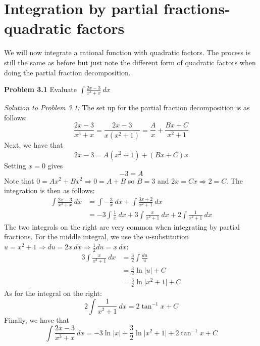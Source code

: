 \documentclass[11pt]{scrartcl}
\begin{document}
\section{Integration by partial fractions-quadratic factors}
We will now integrate a rational function with quadratic factors. The process is still the same as before but just note the different form of quadratic factors when doing the partial fraction decomposition. 
\begin{tcolorbox}
[colback=purple!5!white,colframe=purple!75!black]
\textbf{Problem 3.1} Evaluate $\int{\frac{2x-3}{x^3+x} \ dx}$
\end{tcolorbox}
\noindent 
\textit{Solution to Problem 3.1:} The set up for the partial fraction decomposition is as follows: 
$$\frac{2x-3}{x^3+x}=\frac{2x-3}{x(x^2+1)}=\frac{A}{x}+\frac{Bx+C}{x^2+1}$$
\noindent 
Next, we have that 
$$2x-3=A(x^2+1)+(Bx+C)x$$
\noindent 
Setting $x=0$ gives 
$$-3=A$$
\noindent 
Note that $0=Ax^2+Bx^2 \Rightarrow 0=A+B$ so $B=3$ and $2x=Cx \Rightarrow 2=C$. The integration is then as follows: 
\begin{align*}
    \int{\frac{2x-3}{x^3+x} \ dx} &= \int{-\frac{3}{x} \ dx}+\int{\frac{3x+2}{x^2+1} \ dx} \\
                                  &= -3\int{\frac{1}{x} \ dx} + 3\int{\frac{x}{x^2+1} \ dx}+2\int{\frac{1}{x^2+1} \ dx}
\end{align*}
\noindent 
The two integrals on the right are very common when integrating by partial fractions. For the middle integral, we use the $u$-substitution $u=x^2+1 \Rightarrow du=2x\ dx\Rightarrow \frac{1}{2}du=x \ dx$: 
\begin{align*}
    3\int{\frac{x}{x^2+1} \ dx} &= \frac{3}{2}\int{\frac{du}{u}} \\
                                &=\frac{3}{2} \ln \lvert u \rvert +C \\
                                &=\frac{3}{2} \ln \lvert x^2+1 \rvert + C
\end{align*}
\noindent 
As for the integral on the right: 
$$2\int{\frac{1}{x^2+1} \ dx}=2 {\tan}^{-1} x + C$$
Finally, we have that 
$$\int{\frac{2x-3}{x^3+x} \ dx}=-3 \ln \lvert x \rvert+\frac{3}{2} \ln \lvert x^2+1 \rvert +2\tan^{-1} x + C$$
\end{document}
